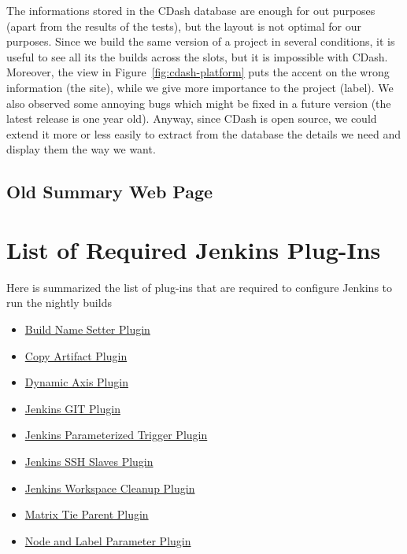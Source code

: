 \documentclass{lhcbnote}
\newcommand{\link}[2]{\href{#1}{#2}}
\begin{document}
The informations stored in the CDash database are enough for out purposes (apart
from the results of the tests), but the layout is not optimal for our purposes.
Since we build the same version of a project in several conditions, it is useful
to see all its the builds across the slots, but it is impossible with CDash.
Moreover, the view in Figure~\ref{fig:cdash-platform} puts the accent on the
wrong information (the site), while we give more importance to the project
(label).  We also observed some annoying bugs which might be fixed in a future
version (the latest release is one year old).  Anyway, since CDash is open
source, we could extend it more or less easily to extract from the database the
details we need and display them the way we want.

\subsection{Old Summary Web Page}




%


\appendix
\section{List of Required Jenkins Plug-Ins}
\label{JenkinsPlugIns}
Here is summarized the list of plug-ins that are required to configure Jenkins
to run the nightly builds
\newcommand{\JPI}[2]{\item \link{#2}{#1}}
\begin{itemize}
  \JPI{Build Name Setter
Plugin}{http://wiki.jenkins-ci.org/display/JENKINS/Build+Name+Setter+Plugin}
  \JPI{Copy Artifact
Plugin}{http://wiki.jenkins-ci.org/display/JENKINS/Copy+Artifact+Plugin}
  \JPI{Dynamic Axis
Plugin}{https://wiki.jenkins-ci.org/display/JENKINS/DynamicAxis+Plugin}
  \JPI{Jenkins GIT
Plugin}{http://wiki.jenkins-ci.org/display/JENKINS/Git+Plugin}
  \JPI{Jenkins Parameterized Trigger
Plugin}{http://wiki.jenkins-ci.org/display/JENKINS/Parameterized+Trigger+Plugin}
  \JPI{Jenkins SSH Slaves
Plugin}{http://wiki.jenkins-ci.org/display/JENKINS/SSH+Slaves+plugin}
  \JPI{Jenkins Workspace Cleanup
Plugin}{http://wiki.jenkins-ci.org/display/JENKINS/Workspace+Cleanup+Plugin}
  \JPI{Matrix Tie Parent
Plugin}{http://wiki.hudson-ci.org/display/HUDSON/Matrix+Tie+Parent+Plugin}
  \JPI{Node and Label Parameter
Plugin}{https://wiki.jenkins-ci.org/display/JENKINS/NodeLabel+Parameter+Plugin}
\end{itemize}
\end{document}
